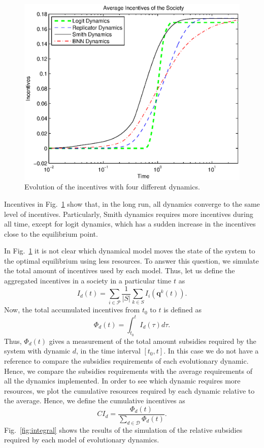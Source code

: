 \documentclass[a4paper,10pt]{article}
\newcommand{\bs}[1]{\boldsymbol{#1}}
\begin{document}
\begin{figure}[hbt]
 \centering
 \includegraphics[width=.75\textwidth]{./images/evolution_i.eps}
 \caption{Evolution of the incentives with four different dynamics.}
 \label{fig:dynamics_i}
\end{figure}



Incentives in Fig.~\ref{fig:dynamics_i} show that, in the long run, all dynamics converge to the same level of incentives. Particularly, Smith dynamics requires more incentives during all time, except for logit dynamics, which has a sudden increase in the incentives close to the equilibrium point. 

In Fig.~\ref{fig:dynamics_i} it is not clear which dynamical model moves the state of the system to the optimal equilibrium using less resources. To answer this question, we simulate the total amount of incentives used by each model.
Thus, let us define the aggregated incentives in a society in a particular time $t$ as
\begin{equation}
 I_d (t) = \sum_{i\in\mathcal{P}} \frac{1}{|S|} \sum_{k\in S} I_i \left( \bs{q}^k (t) \right).
\end{equation}
Now, the total accumulated incentives from $t_0$ to $t$ is defined as 
\begin{equation}
 \varPhi_d (t) = \int_{t_0}^t I_d (\tau) d\tau.
\end{equation}
Thus, $\varPhi_d (t)$ gives a measurement of the total amount subsidies required by the system with dynamic $d$, in the time interval  $[t_0, t]$.
In this case we do not have a reference to compare the subsidies requirements of each evolutionary dynamic. Hence, we compare the subsidies requirements with the average requirements of all the dynamics implemented. 
%
In order to see which dynamic requires more resources, we plot the cumulative resources required by each dynamic relative to the average.
Hence, we define the cumulative incentives as 
%
\begin{equation}
CI_d = \frac{ \varPhi_d (t) }{ \sum_{d\in \mathcal{D}} \varPhi_d (t) }.
\end{equation}
%
Fig.~\ref{fig:integral} shows the results of the simulation of the relative subsidies required by each model of evolutionary dynamics.
%
\end{document}
